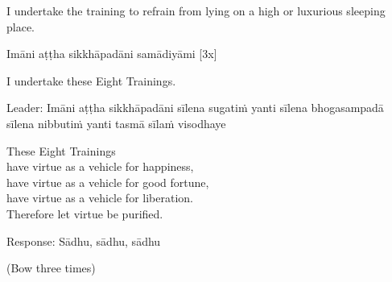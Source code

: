 \begin{english-verses}
  I undertake the training to refrain from lying on a high or luxurious sleeping place.
\end{english-verses}

Imāni aṭṭha sikkhāpadāni samādiyāmi \hfill{[3x]}

\begin{english-verses}
  I undertake these Eight Trainings.
\end{english-verses}

\begin{pali-hang}
Leader: Imāni aṭṭha sikkhāpadāni sīlena sugatiṁ yanti sīlena bhogasampadā sīlena nibbutiṁ yanti tasmā sīlaṁ visodhaye
\end{pali-hang}

\begin{english-verses}
  These Eight Trainings\\
  have virtue as a vehicle for happiness,\\
  have virtue as a vehicle for good fortune,\\
  have virtue as a vehicle for liberation.\\
  Therefore let virtue be purified.\hyperlink{endnote141-appendix}{\hypertarget{endnote141-body}{}}
  \end{english-verses}

Response: Sādhu, sādhu, sādhu

\begin{center}
  (Bow three times)
\end{center}

\clearpage

